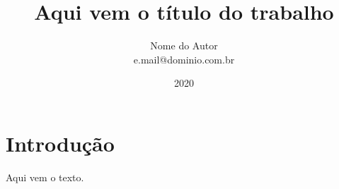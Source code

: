 \documentclass[a4paper, 12pt]{article}
\title{Aqui vem o título do trabalho}
\author{Nome do Autor \\ e.mail@dominio.com.br}
\date{2020}
\begin{document}
\maketitle
\section{Introdução}
Aqui vem o texto.
\end{document}
